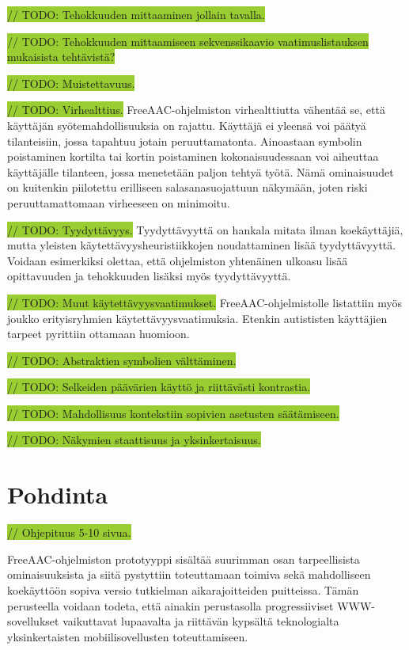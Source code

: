 \documentclass[utf8]{gradu3}
\begin{document}
\colorbox{YellowGreen}{// TODO: Tehokkuuden mittaaminen jollain tavalla.}

\colorbox{YellowGreen}{// TODO: Tehokkuuden mittaamiseen sekvenssikaavio vaatimuslistauksen mukaisista tehtävistä?}

\colorbox{YellowGreen}{// TODO: Muistettavuus.}

\colorbox{YellowGreen}{// TODO: Virhealttius.}
FreeAAC-ohjelmiston virhealttiutta vähentää se, että käyttäjän syötemahdollisuuksia on rajattu. Käyttäjä ei yleensä voi päätyä tilanteisiin, jossa tapahtuu jotain peruuttamatonta. Ainoastaan symbolin poistaminen kortilta tai kortin poistaminen kokonaisuudessaan voi aiheuttaa käyttäjälle tilanteen, jossa menetetään paljon tehtyä työtä. Nämä ominaisuudet on kuitenkin piilotettu erilliseen salasanasuojattuun näkymään, joten riski peruuttamattomaan virheeseen on minimoitu.

\colorbox{YellowGreen}{// TODO: Tyydyttävyys.}
Tyydyttävyyttä on hankala mitata ilman koekäyttäjiä, mutta yleisten käytettävyysheuristiikkojen noudattaminen lisää tyydyttävyyttä. Voidaan esimerkiksi olettaa, että ohjelmiston yhtenäinen ulkoasu lisää opittavuuden ja tehokkuuden lisäksi myös tyydyttävyyttä.

\colorbox{YellowGreen}{// TODO: Muut käytettävyysvaatimukset.}
FreeAAC-ohjelmistolle listattiin myös joukko erityisryhmien käytettävyysvaatimuksia. Etenkin autististen käyttäjien tarpeet pyrittiin ottamaan huomioon.

\colorbox{YellowGreen}{// TODO: Abstraktien symbolien välttäminen. }

\colorbox{YellowGreen}{// TODO: Selkeiden päävärien käyttö ja riittävästi kontrastia.}
  
\colorbox{YellowGreen}{// TODO: Mahdollisuus kontekstiin sopivien asetusten säätämiseen.}
  
\colorbox{YellowGreen}{// TODO: Näkymien staattisuus ja yksinkertaisuus.}

\chapter{Pohdinta}
\colorbox{YellowGreen}{// Ohjepituus 5-10 sivua.}

FreeAAC-ohjelmiston prototyyppi sisältää suurimman osan tarpeellisista ominaisuuksista ja siitä pystyttiin toteuttamaan toimiva sekä mahdolliseen koekäyttöön sopiva versio tutkielman aikarajoitteiden puitteissa. Tämän perusteella voidaan todeta, että ainakin perustasolla progressiiviset WWW-sovellukset vaikuttavat lupaavalta ja riittävän kypsältä teknologialta yksinkertaisten mobiilisovellusten toteuttamiseen.
\end{document}
